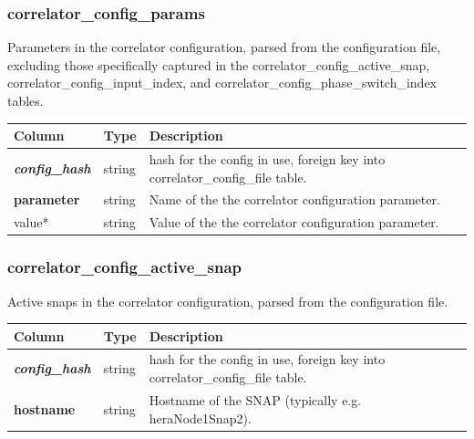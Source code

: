 \documentclass{article}
\begin{document}
{\subsubsection{correlator\_config\_params}
Parameters in the correlator configuration, parsed from the configuration file, excluding those specifically captured in the correlator\_config\_active\_snap, correlator\_config\_input\_index, and correlator\_config\_phase\_switch\_index tables.
\begin{center}
 \begin{tabular}{| p{4cm} | p{2cm} | p{10cm} |}
\hline
 {\bf Column} & {\bf Type}  & {\bf Description} \\ [0.5ex]  \hline\hline
\textbf{\textit{config\_hash}} & string & hash for the config in use, foreign key into correlator\_config\_file table.\\ \hline
\textbf{parameter} & string & Name of the the correlator configuration parameter. \\ \hline
value* & string & Value of the the correlator configuration parameter. \\ \hline
\end{tabular}
\end{center}

\subsubsection{correlator\_config\_active\_snap}
Active snaps in the correlator configuration, parsed from the configuration file.
\begin{center}
 \begin{tabular}{| p{4cm} | p{2cm} | p{10cm} |}
\hline
 {\bf Column} & {\bf Type}  & {\bf Description} \\ [0.5ex]  \hline\hline
\textbf{\textit{config\_hash}} & string & hash for the config in use, foreign key into correlator\_config\_file table.\\ \hline
\textbf{hostname} & string & Hostname of the SNAP (typically e.g. heraNode1Snap2). \\ \hline
\end{tabular}
\end{center}

}
\end{document}
